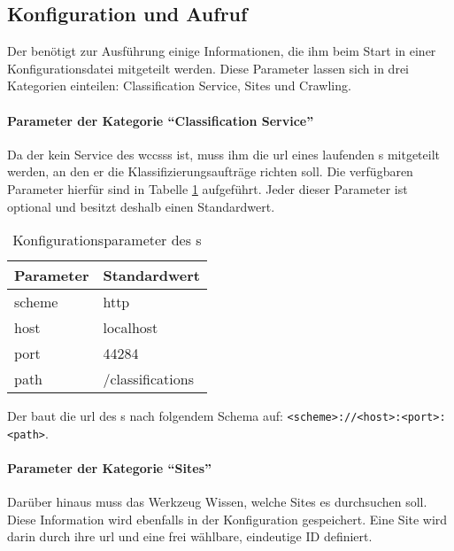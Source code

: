 \subsection{Konfiguration und Aufruf}
    Der {\wordpressCrawler} benötigt zur Ausführung einige Informationen,
    die ihm beim Start in einer Konfigurationsdatei mitgeteilt werden.
    Diese Parameter lassen sich in drei Kategorien einteilen:
    Classification Service, Sites und Crawling.

    \paragraph{Parameter der Kategorie "`Classification Service"'}
    Da der {\wordpressCrawler} kein Service des \glspl{wccs}s ist,
    muss ihm die \gls{url} eines laufenden {\classificationService}s mitgeteilt werden,
    an den er die Klassifizierungsaufträge richten soll.
    Die verfügbaren Parameter hierfür sind in Tabelle \ref{table:crawlerClassificationServiceParameter} aufgeführt.
    Jeder dieser Parameter ist optional und besitzt deshalb einen Standardwert.

    \begin{table}[]
        \centering
        \begin{tabular}{|l|l|}
            \hline
            \textbf{Parameter} & \textbf{Standardwert}\\
            \hline
            scheme & http \\
            \hline
            host & localhost \\
            \hline
            port & 44284 \\
            \hline
            path & /classifications \\
            \hline
            \end{tabular}
        \caption{Konfigurationsparameter des {\wordpressCrawler}s}
        \label{table:crawlerClassificationServiceParameter}
    \end{table}

    Der {\wordpressCrawler} baut die \gls{url} des {\classificationService}s nach
    folgendem Schema auf: \texttt{<scheme>://<host>:<port>:<path>}.

    \paragraph{Parameter der Kategorie "`Sites"'}
    Darüber hinaus muss das Werkzeug Wissen,
    welche {\wordpress} Sites es durchsuchen soll.
    Diese Information wird ebenfalls in der Konfiguration gespeichert.
    Eine {\wordpress} Site wird darin durch
    ihre \gls{url} und eine frei wählbare, eindeutige ID definiert.

